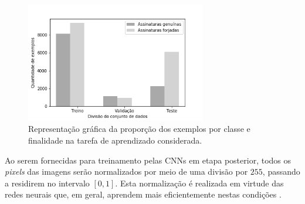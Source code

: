 \begin{figure}[h!]
\centering
\caption{Representação gráfica da proporção dos exemplos por classe e finalidade na tarefa de aprendizado considerada.}
\label{fig:divisao-dados}
\includegraphics[width=0.7\textwidth]{imgs/divisao-dados}
\end{figure}

Ao serem fornecidas para treinamento pelas CNNs em etapa posterior, todos os \emph{pixels} das imagens serão normalizados por meio de uma divisão por $255$, passando a residirem no intervalo $[0,1]$. Esta normalização é realizada em virtude das redes neurais que, em geral, aprendem mais eficientemente nestas condições \cite{chollet}.
